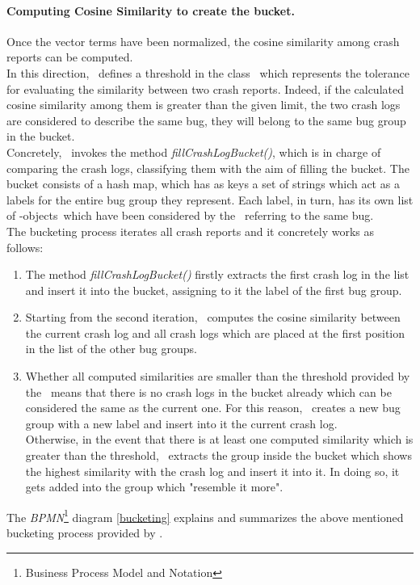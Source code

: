 \paragraph{Computing Cosine Similarity to create the bucket.}
Once the vector terms have been normalized, the cosine similarity among crash reports can be computed. \\
In this direction, \toolname\ defines a threshold in the class \Oracle\,  which represents the tolerance for evaluating the similarity between two crash reports. Indeed, if the calculated cosine similarity among them is greater than the given limit, the two crash logs are considered to describe the same bug, \ie they will belong to the same bug group in the bucket. \\
Concretely, \toolname\ invokes the method \textit{fillCrashLogBucket()}, which is in charge of comparing the crash logs, classifying them with the aim of filling the bucket. 
The bucket consists of a hash map, which has as keys a set of strings which act as a labels for the entire bug group they represent. Each label, in turn, has its own list of \Crash-objects\, which have been considered by the \Oracle\ referring to the same bug.  \\
The bucketing process iterates all crash reports and it concretely works as follows: 
\begin{enumerate}
\item The method \textit{fillCrashLogBucket()} firstly extracts the first crash log in the list and insert it into the bucket, assigning to it the label of the first bug group. 
\item Starting from the second iteration, \toolname\ computes the cosine similarity between the current crash log and all crash logs which are placed at the first position in the list of the other bug groups. 
\item Whether all computed similarities are smaller than the threshold provided by the \Oracle\, means that there is no crash logs in the bucket already which can be considered the same as the current one. For this reason, \toolname\ creates a new bug group with a new label and insert into it the current crash log. \\
Otherwise, in the event that there is at least one computed similarity which is greater than the threshold, \toolname\ extracts the group inside the bucket which shows the highest similarity with the crash log and insert it into it.
In doing so, it gets added into the group which "resemble it more". 
\end{enumerate}
The \textit{BPMN}\footnote{Business Process Model and Notation} diagram \ref{bucketing} explains and summarizes the above mentioned bucketing process provided by \toolname. \\

